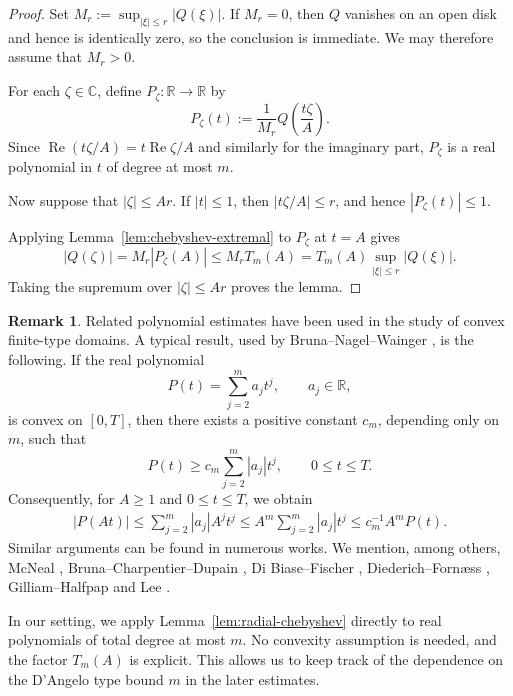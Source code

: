 \documentclass[11pt]{article}
\theoremstyle{definition}
\newtheorem{remark}[theorem]{Remark}
\newcommand{\C}{\mathbb{C}}
\newcommand{\R}{\mathbb{R}}
\begin{document}
\begin{proof}
	Set \(M_r:=\sup_{|\xi|\le r}|Q(\xi)|\).
	If \(M_r=0\), then \(Q\)
	vanishes on an open disk and hence is identically zero, so the conclusion
	is immediate.  We may therefore assume that \(M_r>0\).

	For each \(\zeta\in\C\), define \(P_\zeta:\R\to\R\) by
	\[
	P_\zeta(t):=\frac{1}{M_r}Q\left(\frac{t\zeta}{A}\right).
	\]
	Since
	\(\operatorname{Re}(t\zeta/A)=t\operatorname{Re}\zeta/A\) and similarly
	for the imaginary part, \(P_\zeta\) is a real polynomial in \(t\) of
	degree at most \(m\).

	Now suppose that \(|\zeta|\le Ar\).  If \(|t|\le1\), then
	\(|t\zeta/A|\le r\), and hence \(|P_\zeta(t)|\le1\).

	Applying Lemma~\ref{lem:chebyshev-extremal} to \(P_\zeta\) at \(t=A\)
	gives
	\[
	|Q(\zeta)|=M_r|P_\zeta(A)|
	\le M_rT_m(A)
	=T_m(A)\sup_{|\xi|\le r}|Q(\xi)|.
	\]
	Taking the supremum over \(|\zeta|\le Ar\) proves the lemma.
\end{proof}
\begin{remark}\label{rem:chebyshev-versus-convex-polynomials}
Related polynomial estimates have been used in the study of convex
finite-type domains.  A typical result, used by Bruna--Nagel--Wainger
\cite{BrunaNagelWainger}, is the following.  If the real polynomial
\[
P(t)=\sum_{j=2}^{m}a_jt^j,\qquad a_j\in\R,
\]
is convex on \([0,T]\), then there exists a positive constant \(c_m\), depending only on \(m\), such that
\[
P(t)\ge c_m\sum_{j=2}^{m}|a_j|t^j,
\qquad 0\le t\le T.
\]
Consequently, for \(A\ge1\) and \(0\le t\le T\), we obtain
\[
\begin{aligned}
	|P(At)|
	\le
	\sum_{j=2}^{m}|a_j|A^jt^j
	\le
	A^m\sum_{j=2}^{m}|a_j|t^j
	\le
	c_m^{-1}A^mP(t).
\end{aligned}
\]
Similar arguments can be found in numerous works. We mention, among
others, McNeal \cite{McNealBergman}, Bruna--Charpentier--Dupain
\cite{BrunaCharpentierDupain}, Di Biase--Fischer
\cite{DiBiaseFischerBoundary}, Diederich--Forn{\ae}ss
\cite{DiederichFornaessSupport}, Gilliam--Halfpap
\cite{GilliamHalfpapSzego} and Lee \cite{LeeKobayashi}.

In our setting, we apply Lemma~\ref{lem:radial-chebyshev} directly
to real polynomials of total degree at most \(m\).
No convexity assumption is needed, and the factor \(T_m(A)\) is explicit.
This allows us to keep track of the dependence on the D'Angelo type
bound \(m\) in the later estimates.
\end{remark}
\end{document}
